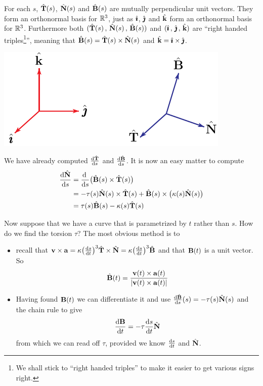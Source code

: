 For each $s$, $\hat{\mathbf{T}}(s)$, $\hat{\mathbf{N}}(s)$ and $\hat{\mathbf{B}}(s)$ are mutually
perpendicular unit vectors. They form an orthonormal basis
for $\mathbb{R}^3$, just as $\hat{\pmb{\imath}}$, $\hat{\pmb{\jmath}}$ and $\hat{\mathbf{k}}$ form an orthonormal basis
for $\mathbb{R}^3$. Furthermore both $(\hat{\mathbf{T}}(s)\,,\,\hat{\mathbf{N}}(s)\,,\,\hat{\mathbf{B}}(s))$ 
and $(\hat{\pmb{\imath}}\,,\,\hat{\pmb{\jmath}}\,,\,\hat{\mathbf{k}})$ are ``right handed triples\footnote{We shall
stick to ``right handed triples'' to make it easier to get various signs right.}'',
meaning that $\hat{\mathbf{B}}(s) = \hat{\mathbf{T}}(s)\times\hat{\mathbf{N}}(s)$ and $\hat{\mathbf{k}}=\hat{\pmb{\imath}}\times\hat{\pmb{\jmath}}$.


\begin{efig}
\begin{center}
     \includegraphics{cross.pdf}
\end{center}
\end{efig}

We have already computed $\diff{\hat\vT}{s}$ and $\diff{\hat\vB}{s}$.
It is now an easy matter to compute
\begin{align*}
\diff{\hat\vN}{s} 
&= \diff{}{s}\big(\hat\vB(s)\times\hat\vT(s)\big)\\
&= -\tau(s)\hat\vN(s)\times\hat\vT(s)
  +\hat\vB(s)\times\big(\ka(s)\hat\vN(s)\big) \\
&=\tau(s)\hat\vB(s)-\ka(s)\hat\vT(s)
\end{align*}


Now suppose that we have a curve that is parametrized by $t$ rather than $s$.
How do we find the torsion $\tau$? The most obvious method is to
\begin{itemize}
\item
recall that $\vv\times\va = \ka \big(\diff{s}{t}\big)^3\hat\vT\times\hat\vN
                          = \ka \big(\diff{s}{t}\big)^3\hat\vB$
and that $\mathbf{B}(t)$ is a unit vector. So
\begin{equation*}
\hat{\mathbf{B}}(t) = \frac{\mathbf{v}(t)\times\mathbf{a}(t)}{|\mathbf{v}(t)\times\mathbf{a}(t)|}
\end{equation*}

\item Having found $\mathbf{B}(t)$ we can differentiate it and use
$\diff{\hat\vB}{s}(s) = -\tau(s)\hat\vN(s)$ and the chain rule to give
\begin{equation*}
\diff{\vB}{t} = -\tau\diff{s}{t} \hat\vN
\end{equation*}
from which we can read off $\tau$, provided we know $\diff{s}{t}$ and
$\hat{\mathbf{N}}$.

\end{itemize}


